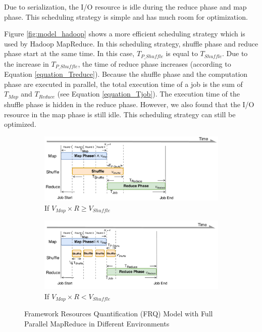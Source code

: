 {Due to serialization, the I/O resource is idle during the reduce phase and map phase. This scheduling strategy is simple and has much room for optimization.

Figure \ref{fig:model_hadoop} shows a more efficient scheduling strategy which is used by Hadoop MapReduce. In this scheduling strategy, shuffle phase and reduce phase start at the same time. In this case, \(T_{P\_Shuffle}\) is equal to \(T_{Shuffle}\). Due to the increase in \(T_{P\_Shuffle}\), the time of reduce phase increases (according to Equation \ref{equation_Treduce}). Because the shuffle phase and the computation phase are executed in parallel, the total execution time of a job is the sum of \(T_{Map}\) and \(T_{Reduce}\) (see Equation \ref{equation_Tjob}). The execution time of the shuffle phase is hidden in the reduce phase. 
However, we also found that the I/O resource in the map phase is still idle. This scheduling strategy can still be optimized.

\begin{figure}
	\centering
	\begin{subfigure}{0.47\linewidth}
		\includegraphics[width=\linewidth]{fig/model_scache1}
		\caption{\color{blue}If \(V_{Map} \times R \ge V_{Shuffle}\)}
		\label{fig:model_scache1}
	\end{subfigure}
	\begin{subfigure}{0.47\linewidth}
		\includegraphics[width=\linewidth]{fig/model_scache2}
		\caption{\color{blue}If \(V_{Map} \times R < V_{Shuffle}\)}
		\label{fig:model_scache2}
	\end{subfigure}
	\caption{\color{blue}Framework Resources Quantification (FRQ) Model with Full Parallel MapReduce in Different Environments}
	\label{fig:model_scache}
\end{figure}

}
